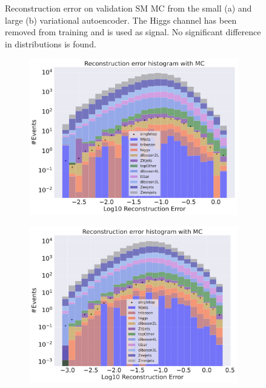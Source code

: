 \begin{figure}[H]
\begin{subfigure}{.45\textwidth}
        \caption{ }
        \label{fig:vae_big_higgs}
    \end{subfigure}
    \hfill  
    \caption[VAE | Reconstruction error using Higgs channel as signal]{Reconstruction error on validation SM MC from the small (a) and large (b) variational autoencoder. The Higgs channel has been removed from training and 
    is used as signal. No significant difference in distributions is found. }
    \label{fig:vae_big_channel_1}
\end{figure}

\begin{figure}[H]
    \centering
    \begin{subfigure}{.45\textwidth}
        \includegraphics[width=\textwidth]{Figures/VAE_testing/small/b_data_recon_big_rm3_feats_sig_singletop.pdf}
        \caption{ }
        \label{fig:vae_small_singletop}
    \end{subfigure}
    \hfill
    \begin{subfigure}{.45\textwidth}
        \includegraphics[width=\textwidth]{Figures/VAE_testing/big/b_data_recon_big_rm3_feats_sig_singletop.pdf}

\end{subfigure}
\end{figure}
